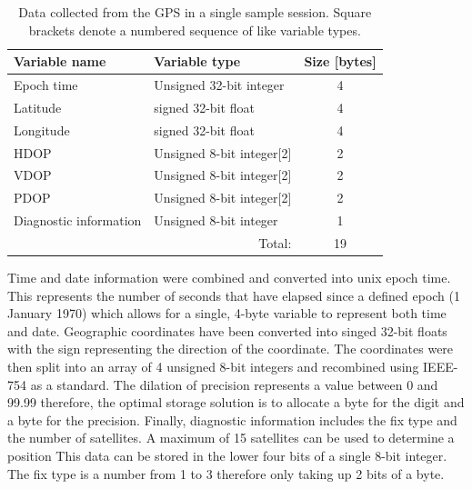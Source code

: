 \begin{table}[H]
	\centering
	\caption{Data collected from the GPS in a single sample session. Square brackets denote a numbered sequence of like variable types.}
	\setlength{\extrarowheight}{5pt}
	\begin{tabular}{llc}
		\hline
		\textbf{Variable name}  &  \textbf{Variable type} & \textbf{Size [bytes]}  \\
		\hline
		Epoch time & Unsigned 32-bit integer & 4  \\
		Latitude & signed 32-bit float & 4 \\
		Longitude & signed 32-bit float & 4 \\
		HDOP & Unsigned 8-bit integer[2] & 2\\
		VDOP & Unsigned 8-bit integer[2] & 2\\
		PDOP & Unsigned 8-bit integer[2] & 2\\
		Diagnostic information & Unsigned 8-bit integer & 1 \\
		\hline
		\cline{3-3}
		\multicolumn{2}{r}{Total: } & \multicolumn{1}{c}{19}\\
		\cline{3-3}
		\cline{3-3}
		
	\end{tabular}
	\label{tab:GPS_Data}
\end{table}

Time and date information were combined and converted into unix epoch time. This represents the number of seconds that have elapsed since a defined epoch (1 January 1970) which allows for a single, 4-byte variable to represent both time and date. Geographic coordinates have been converted into singed 32-bit floats with the sign representing the direction of the coordinate. The coordinates were then split into an array of 4 unsigned 8-bit integers and recombined using IEEE-754 as a standard. The dilation of precision represents a value between 0 and 99.99 therefore, the optimal storage solution is to allocate a byte for the digit and a byte for the precision. Finally, diagnostic information includes the fix type and the number of satellites. A maximum of 15 satellites can be used to determine a position This data can be stored in the lower four bits of a single 8-bit integer. The fix type is a number from 1 to 3 therefore only taking up 2 bits of a byte.\par 


